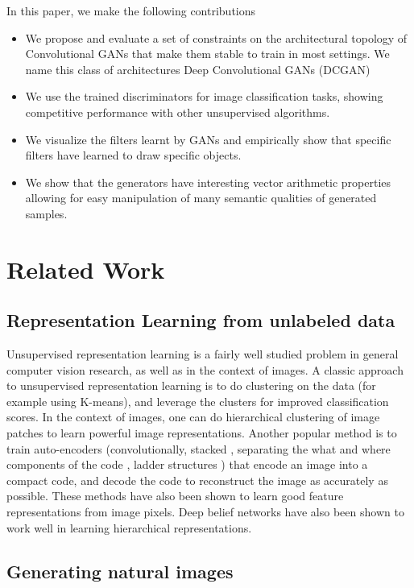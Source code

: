 \documentclass{article} \usepackage{iclr2016_conference,times}
\begin{document}
In this paper, we make the following contributions
\begin{itemize}  
    \item We propose and evaluate a set of constraints on the architectural topology of Convolutional GANs that make them stable to train in most settings. We name this class of architectures Deep Convolutional GANs (DCGAN)
    \item We use the trained discriminators for image classification tasks, showing competitive performance with other unsupervised algorithms.
    \item We visualize the filters learnt by GANs and empirically show that specific filters have learned to draw specific objects.
    \item We show that the generators have interesting vector arithmetic properties allowing for easy manipulation of many semantic qualities of generated samples.
\end{itemize}

\section{Related Work}
\subsection{Representation Learning from unlabeled data}
Unsupervised representation learning is a fairly well studied problem in general computer vision research, as well as in the context of images. A classic approach to unsupervised representation learning is to do clustering on the data (for example using K-means), and leverage the clusters for improved classification scores. In the context of images, one can do hierarchical clustering of image patches \citep{coates2012learning} to learn powerful image representations. Another popular method is to train auto-encoders (convolutionally, stacked \citep{vincent2010stacked}, separating the what and where components of the code \citep{zhao2015stacked}, ladder structures \citep{rasmus2015semi}) that encode an image into a compact code, and decode the code to reconstruct the image as accurately as possible. These methods have also been shown to learn good feature representations from image pixels. Deep belief networks \citep{lee2009convolutional} have also been shown to work well in learning hierarchical representations.

\subsection{Generating natural images}
\end{document}

